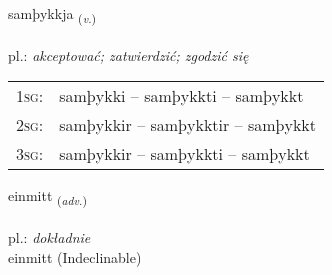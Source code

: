 \documentclass[frontgrid, backgrid]{flacards}\usepackage[]{graphicx}\usepackage[]{xcolor}
\begin{document}
\renewcommand{\flhead}{\vskip5pt \fboxsep=0pt {\small\bfseries\footnotesize Sagnorð | czasownik}}
\renewcommand{\fcfoot}{\vskip5pt \fboxsep=0pt \hspace{2pt}{\small\bfseries\footnotesize 1K}}

\renewcommand{\blhead}{\vskip5pt {\small\bfseries\footnotesize Sagnorð | czasownik }}
\renewcommand{\bcfoot}{\vskip5pt \hspace{2pt}{\small\bfseries\footnotesize 1K}}


{samþykkja \small{\textsubscript{(\textit{v.})}} \\[1ex] %
\textphonetic{[samθɪhca]} \\
pl.: \emph{akceptować; zatwierdzić; zgodzić się} \\  [2ex]
\renewcommand*{\arraystretch}{0.8}
\begin{tabular}{p{1cm}l}
\textsc{1sg}: & samþykki -- samþykkti -- samþykkt \\ 
\textsc{2sg}: & samþykkir -- samþykktir -- samþykkt \\ 
\textsc{3sg}: & samþykkir -- samþykkti -- samþykkt \\ 
\end{tabular}
}


\renewcommand{\flhead}{\vskip5pt \fboxsep=0pt {\small\bfseries\footnotesize Atviksorð | przysłówek}}
\renewcommand{\fcfoot}{\vskip5pt \fboxsep=0pt \hspace{2pt}{\small\bfseries\footnotesize 1K}}

\renewcommand{\blhead}{\vskip5pt {\small\bfseries\footnotesize Atviksorð | przysłówek }}
\renewcommand{\bcfoot}{\vskip5pt \hspace{2pt}{\small\bfseries\footnotesize 1K}}


{einmitt \small{\textsubscript{(\textit{adv.})}} \\[1ex]
\textphonetic{[einmɪht]} \\
pl.: \emph{dokładnie} \\  [2ex]
einmitt (Indeclinable)}
\end{document}
